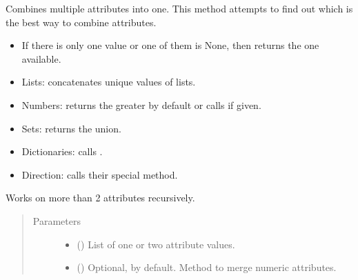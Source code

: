 \documentclass[letterpaper,10pt,english]{sphinxmanual}
\begin{document}
\begin{fulllineitems}
\begin{fulllineitems}
\begin{quote}
\begin{description}
\end{description}\end{quote}

\end{fulllineitems}


\begin{fulllineitems}
\label{\detokenize{main:pypath.main.PyPath.combine_attr}}
Combines multiple attributes into one. This method attempts
to find out which is the best way to combine attributes.
\begin{itemize}
\item {} 
If there is only one value or one of them is None, then
returns the one available.

\item {} 
Lists: concatenates unique values of lists.

\item {} 
Numbers: returns the greater by default or calls
 if given.

\item {} 
Sets: returns the union.

\item {} 
Dictionaries: calls .

\item {} 
Direction: calls their special
{\hyperref[\detokenize{main:pypath.main.Direction.merge}]{}} method.

\end{itemize}

Works on more than 2 attributes recursively.
\begin{quote}\begin{description}
\item[{Parameters}] \leavevmode\begin{itemize}
\item {} 
 () \textendash{} List of one or two attribute values.

\item {} 
 () \textendash{} Optional,  by default. Method to merge numeric
attributes.


\end{itemize}
\end{description}
\end{quote}
\end{fulllineitems}
\end{fulllineitems}
\end{document}
